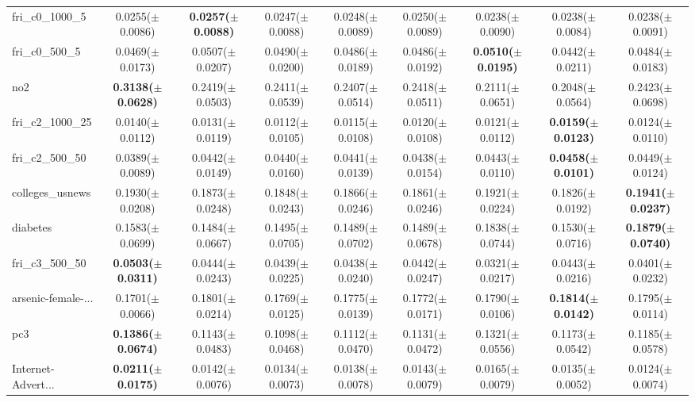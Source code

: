 \begin{longtable}{lcccccccc}
fri\_c0\_1000\_5 & 0.0255($\pm$0.0086) & \textbf{0.0257($\pm$0.0088)} & 0.0247($\pm$0.0088) & 0.0248($\pm$0.0089) & 0.0250($\pm$0.0089) & 0.0238($\pm$0.0090) & 0.0238($\pm$0.0084) & 0.0238($\pm$0.0091) \\
fri\_c0\_500\_5 & 0.0469($\pm$0.0173) & 0.0507($\pm$0.0207) & 0.0490($\pm$0.0200) & 0.0486($\pm$0.0189) & 0.0486($\pm$0.0192) & \textbf{0.0510($\pm$0.0195)} & 0.0442($\pm$0.0211) & 0.0484($\pm$0.0183) \\
no2 & \textbf{0.3138($\pm$0.0628)} & 0.2419($\pm$0.0503) & 0.2411($\pm$0.0539) & 0.2407($\pm$0.0514) & 0.2418($\pm$0.0511) & 0.2111($\pm$0.0651) & 0.2048($\pm$0.0564) & 0.2423($\pm$0.0698) \\
fri\_c2\_1000\_25 & 0.0140($\pm$0.0112) & 0.0131($\pm$0.0119) & 0.0112($\pm$0.0105) & 0.0115($\pm$0.0108) & 0.0120($\pm$0.0108) & 0.0121($\pm$0.0112) & \textbf{0.0159($\pm$0.0123)} & 0.0124($\pm$0.0110) \\
fri\_c2\_500\_50 & 0.0389($\pm$0.0089) & 0.0442($\pm$0.0149) & 0.0440($\pm$0.0160) & 0.0441($\pm$0.0139) & 0.0438($\pm$0.0154) & 0.0443($\pm$0.0110) & \textbf{0.0458($\pm$0.0101)} & 0.0449($\pm$0.0124) \\
colleges\_usnews & 0.1930($\pm$0.0208) & 0.1873($\pm$0.0248) & 0.1848($\pm$0.0243) & 0.1866($\pm$0.0246) & 0.1861($\pm$0.0246) & 0.1921($\pm$0.0224) & 0.1826($\pm$0.0192) & \textbf{0.1941($\pm$0.0237)} \\
diabetes & 0.1583($\pm$0.0699) & 0.1484($\pm$0.0667) & 0.1495($\pm$0.0705) & 0.1489($\pm$0.0702) & 0.1489($\pm$0.0678) & 0.1838($\pm$0.0744) & 0.1530($\pm$0.0716) & \textbf{0.1879($\pm$0.0740)} \\
fri\_c3\_500\_50 & \textbf{0.0503($\pm$0.0311)} & 0.0444($\pm$0.0243) & 0.0439($\pm$0.0225) & 0.0438($\pm$0.0240) & 0.0442($\pm$0.0247) & 0.0321($\pm$0.0217) & 0.0443($\pm$0.0216) & 0.0401($\pm$0.0232) \\
arsenic-female-... & 0.1701($\pm$0.0066) & 0.1801($\pm$0.0214) & 0.1769($\pm$0.0125) & 0.1775($\pm$0.0139) & 0.1772($\pm$0.0171) & 0.1790($\pm$0.0106) & \textbf{0.1814($\pm$0.0142)} & 0.1795($\pm$0.0114) \\
pc3 & \textbf{0.1386($\pm$0.0674)} & 0.1143($\pm$0.0483) & 0.1098($\pm$0.0468) & 0.1112($\pm$0.0470) & 0.1131($\pm$0.0472) & 0.1321($\pm$0.0556) & 0.1173($\pm$0.0542) & 0.1185($\pm$0.0578) \\
Internet-Advert... & \textbf{0.0211($\pm$0.0175)} & 0.0142($\pm$0.0076) & 0.0134($\pm$0.0073) & 0.0138($\pm$0.0078) & 0.0143($\pm$0.0079) & 0.0165($\pm$0.0079) & 0.0135($\pm$0.0052) & 0.0124($\pm$0.0074) \\

\end{longtable}
